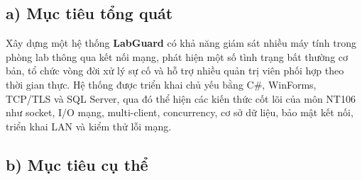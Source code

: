 
\subsection*{a) Mục tiêu tổng quát}

Xây dựng một hệ thống \textbf{LabGuard} có khả năng giám sát nhiều máy tính trong phòng lab thông qua kết nối mạng, phát hiện một số tình trạng bất thường cơ bản, tổ chức vòng đời xử lý sự cố và hỗ trợ nhiều quản trị viên phối hợp theo thời gian thực. Hệ thống được triển khai chủ yếu bằng C\#, WinForms, TCP/TLS và SQL Server, qua đó thể hiện các kiến thức cốt lõi của môn NT106 như socket, I/O mạng, multi-client, concurrency, cơ sở dữ liệu, bảo mật kết nối, triển khai LAN và kiểm thử lỗi mạng.

\subsection*{b) Mục tiêu cụ thể}

